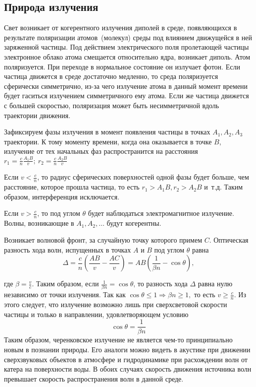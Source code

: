 \begin{Diplom-Main}
	 \subsection{Природа излучения}
	 \label{sec:subsection}
	 
	 Свет возникает от когерентного излучения диполей в среде, появляющихся в результате поляризации атомов~(молекул) среды под влиянием движущейся в ней заряженной частицы.
	 Под действием электрического поля пролетающей частицы электронное облако атома смещается относительно ядра, возникает диполь. Атом поляризуется. 
	 При переходе в нормальное состояние он излучает фотон. 
	 Если частица движется в среде достаточно медленно, то среда поляризуется сферически симметрично, из-за чего излучение атома в данный момент времени будет гаситься излучением симметричного ему атома.
	 Если же частица движется с большей скоростью, поляризация может быть несимметричной вдоль траектории движения.  
	 
	 Зафиксируем фазы излучения в момент появления частицы в точках $A_1, A_2, A_3$ траектории. 
	 К тому моменту времени, когда она оказывается в точке $B$, излучение от тех начальных фаз распространится на расстояния~$r_1 = \frac{c}{n} \frac{A_1B}{v};~r_2 = \frac{c}{n} \frac{A_2B}{v}$
	 
	 Если $v < \frac{c}{n}$, то радиус сферических поверхностей одной фазы будет больше, чем расстояние, которое прошла частица, то есть $r_1 > A_1B, r_2 > A_2B$ и~т.д. Таким образом, интерференция исключается.
	 
	 Если $v > \frac{c}{n}$, то под углом $\theta $ будет наблюдаться электромагнитное излучение. Волны, возникающие в $ A_1, A_2, \dots $ будут когерентны.
	 
	 Возникает волновой фронт, за случайную точку которого примем $ C $.
	 Оптическая разность хода волн, испущенных в точках $ A $ и $ B $ под углом $ \theta $ равна 
	 \begin{equation}
	 	\Delta = \frac{c}{n}(\frac{AB}{v} - \frac{AC}{v}) = AB(\frac{1}{\beta n} - \cos{\theta}), \label{dimension}
	 \end{equation}
	 
	 где $ \beta = \frac{v}{c} $.
	 Таким образом, если $ \frac{1}{\beta n} = \cos{\theta}$, то разность хода $\Delta $ равна нулю независимо от точки излучения. Так как $ \cos{\theta} \leq 1 \Rightarrow \beta n \geq 1, $ то есть $ v \geq \frac{c}{n} $. Из этого следует, что излучение возможно лишь при сверхсветовой скорости частицы и только в направлении, удовлетворяющем условию 
	 \begin{equation}
		\cos{\theta} = \frac{1}{\beta n}
		\label{costheta}
	 \end{equation}
	Таким образом, черенковское излучение не является чем-то принципиально новым в познании природы.
	Его аналоги можно видеть в акустике при движении сверхзвуковых объектов в атмосфере и гидродинамике при расхождении волн от катера на поверхности воды. В обоих случаях скорость движения источника волн превышает скорость распространения волн в данной среде.
	

\end{Diplom-Main}
